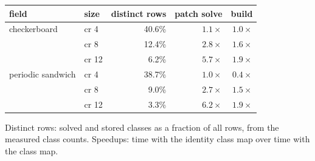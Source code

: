 {\small
\begin{tabular}{llrrr}
\toprule
field & size & distinct rows & patch solve & build \\
\midrule
checkerboard & cr 4 & 40.6\% & $1.1\times$ & $1.0\times$ \\
 & cr 8 & 12.4\% & $2.8\times$ & $1.6\times$ \\
 & cr 12 & 6.2\% & $5.7\times$ & $1.9\times$ \\
\midrule
periodic sandwich & cr 4 & 38.7\% & $1.0\times$ & $0.4\times$ \\
 & cr 8 & 9.0\% & $2.7\times$ & $1.5\times$ \\
 & cr 12 & 3.3\% & $6.2\times$ & $1.9\times$ \\
\bottomrule
\end{tabular}
\par\smallskip
{\footnotesize Distinct rows: solved and stored classes as a fraction of all rows, from the measured class counts.  Speedups: time with the identity class map over time with the class map.}
}
